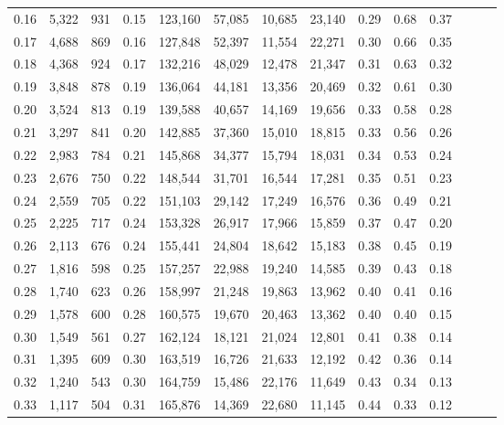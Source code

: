 \begin{tabular}{rrrrrrrrrrrrrr}
0.16 &   5,322 &    931 &  0.15 &  123,160 &   57,085 &  10,685 &  23,140 &  0.29 &  0.68 &      0.37 \\
0.17 &   4,688 &    869 &  0.16 &  127,848 &   52,397 &  11,554 &  22,271 &  0.30 &  0.66 &      0.35 \\
0.18 &   4,368 &    924 &  0.17 &  132,216 &   48,029 &  12,478 &  21,347 &  0.31 &  0.63 &      0.32 \\
0.19 &   3,848 &    878 &  0.19 &  136,064 &   44,181 &  13,356 &  20,469 &  0.32 &  0.61 &      0.30 \\
0.20 &   3,524 &    813 &  0.19 &  139,588 &   40,657 &  14,169 &  19,656 &  0.33 &  0.58 &      0.28 \\
0.21 &   3,297 &    841 &  0.20 &  142,885 &   37,360 &  15,010 &  18,815 &  0.33 &  0.56 &      0.26 \\
0.22 &   2,983 &    784 &  0.21 &  145,868 &   34,377 &  15,794 &  18,031 &  0.34 &  0.53 &      0.24 \\
0.23 &   2,676 &    750 &  0.22 &  148,544 &   31,701 &  16,544 &  17,281 &  0.35 &  0.51 &      0.23 \\
0.24 &   2,559 &    705 &  0.22 &  151,103 &   29,142 &  17,249 &  16,576 &  0.36 &  0.49 &      0.21 \\
0.25 &   2,225 &    717 &  0.24 &  153,328 &   26,917 &  17,966 &  15,859 &  0.37 &  0.47 &      0.20 \\
0.26 &   2,113 &    676 &  0.24 &  155,441 &   24,804 &  18,642 &  15,183 &  0.38 &  0.45 &      0.19 \\
0.27 &   1,816 &    598 &  0.25 &  157,257 &   22,988 &  19,240 &  14,585 &  0.39 &  0.43 &      0.18 \\
0.28 &   1,740 &    623 &  0.26 &  158,997 &   21,248 &  19,863 &  13,962 &  0.40 &  0.41 &      0.16 \\
0.29 &   1,578 &    600 &  0.28 &  160,575 &   19,670 &  20,463 &  13,362 &  0.40 &  0.40 &      0.15 \\
0.30 &   1,549 &    561 &  0.27 &  162,124 &   18,121 &  21,024 &  12,801 &  0.41 &  0.38 &      0.14 \\
0.31 &   1,395 &    609 &  0.30 &  163,519 &   16,726 &  21,633 &  12,192 &  0.42 &  0.36 &      0.14 \\
0.32 &   1,240 &    543 &  0.30 &  164,759 &   15,486 &  22,176 &  11,649 &  0.43 &  0.34 &      0.13 \\
0.33 &   1,117 &    504 &  0.31 &  165,876 &   14,369 &  22,680 &  11,145 &  0.44 &  0.33 &      0.12 \\

\end{tabular}
